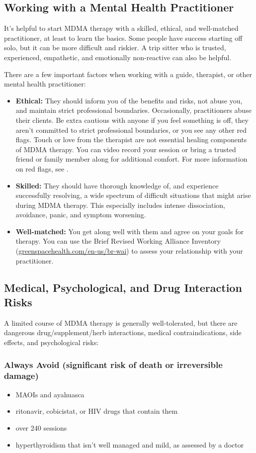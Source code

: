 \documentclass[11pt,oneside]{book}
\let\cite\parencite
\begin{document}
\subsection*{Working with a Mental Health Practitioner}
It's helpful to start MDMA therapy with a skilled, ethical, and well-matched practitioner, at least to learn the basics. Some people have success starting off solo, but it can be more difficult and riskier. A trip sitter who is trusted, experienced, empathetic, and emotionally non-reactive can also be helpful.

There are a few important factors when working with a guide, therapist, or other mental health practitioner:
\begin{itemize}
    \item \textbf{Ethical:} They should inform you of the benefits and risks, not abuse you, and maintain strict professional boundaries. Occasionally, practitioners abuse their clients. Be extra cautious with anyone if you feel something is off, they aren't committed to strict professional boundaries, or you see any other red flags. Touch or love from the therapist are not essential healing components of MDMA therapy. You can video record your session or bring a trusted friend or family member along for additional comfort. For more information on red flags, see \textcite{safetyFlags}.
    \item \textbf{Skilled:} They should have thorough knowledge of, and experience successfully resolving, a wide spectrum of difficult situations that might arise during MDMA therapy. This especially includes intense dissociation, avoidance, panic, and symptom worsening.
    \item \textbf{Well-matched:} You get along well with them and agree on your goals for therapy. You can use the Brief Revised Working Alliance Inventory (\href{https://greenspacehealth.com/en-us/br-wai}{greenspacehealth.com/en-us/br-wai}) to assess your relationship with your practitioner.
\end{itemize}

\subsection*{Medical, Psychological, and Drug Interaction Risks}
A limited course of MDMA therapy is generally well-tolerated, but there are dangerous drug/supplement/herb interactions, medical contraindications, side effects, and psychological risks:

\subsubsection*{Always Avoid (significant risk of death or irreversible damage)}
\begin{itemize}
    \item MAOIs and ayahuasca
    \item ritonavir, cobicistat, or HIV drugs that contain them
    \item over 240 sessions
    \item hyperthyroidism that isn't well managed and mild, as assessed by a doctor~\cite{mitchellMDMAClinicalTrial2}
\end{itemize}
\end{document}

